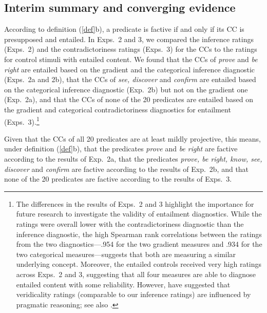 \documentclass[11pt,fleqn]{article}
\newcommand{\6}{\mbox{$[\hspace*{-.6mm}[$}}
\newcommand{\9}{\mbox{$]\hspace*{-.6mm}]$}}
\begin{document}
{%
\subsection{Interim summary and converging evidence}\label{s33}

According to definition (\ref{def}b), a predicate is factive if and only if its CC is presupposed and entailed. In Exps.~2 and 3, we compared the inference ratings (Exps.~2) and the contradictoriness ratings (Exps.~3) for the CCs to the ratings for control stimuli with entailed content. We found that the CCs of {\em prove} and {\em be right} are entailed based on the gradient and the categorical inference diagnostic (Exps.~2a and 2b), that the CCs of {\em see, discover} and {\em confirm} are entailed based on the categorical inference diagnostic (Exp.~2b) but not on the gradient one (Exp.~2a), and that the CCs of none of the 20 predicates are entailed based on the gradient and categorical contradictoriness diagnostics for entailment (Exps.~3).\footnote{The differences in the results of Exps.~2 and 3 highlight the importance for future research to investigate the validity of entailment diagnostics. While the ratings were overall lower with the  contradictoriness diagnostic than the inference diagnostic, the high Spearman rank correlations between the ratings from the two diagnostics---.954 for the two gradient measures and .934 for the two categorical measures---suggests that both are measuring a similar underlying concept. Moreover, the entailed controls received very high ratings across Exps.~2 and 3, suggesting that all four measures are able to diagnose entailed content with some reliability.   However, \citet[329]{demarneffe-etal2012} have suggested that veridicality ratings (comparable to our inference ratings) are influenced by pragmatic reasoning; see also \citealt{pavlick-kwiatkowski2019}.}} Given that the CCs of all 20 predicates are at least mildly projective, this means, under definition (\ref{def}b), that the predicates {\em prove} and {\em be right} are factive according to the results of Exp.~2a, that the predicates {\em prove, be right, know, see, discover} and {\em confirm} are factive according to the results of Exp.~2b, and that none of the 20 predicates are factive according to the results of Exps.~3.  
\end{document}
